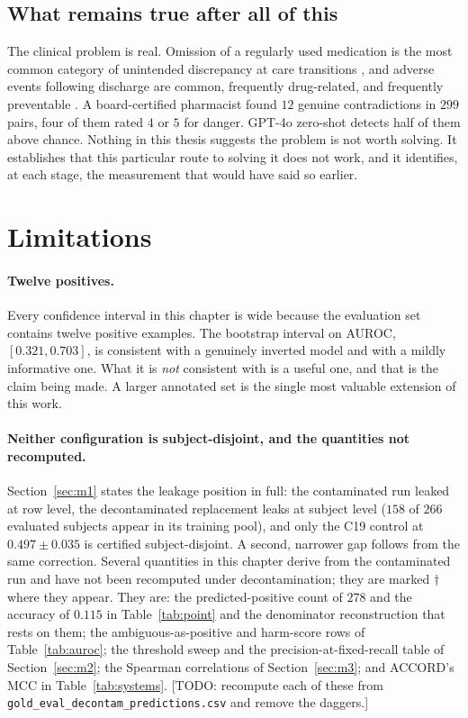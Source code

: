 \subsection{What remains true after all of this}

The clinical problem is real. Omission of a regularly used medication is the
most common category of unintended discrepancy at care transitions
\citep{cornish2005discrepancies}, and adverse events following discharge are
common, frequently drug-related, and frequently preventable
\citep{forster2003adverse}. A board-certified pharmacist found $12$ genuine
contradictions in $299$ pairs, four of them rated $4$ or $5$ for danger. GPT-4o
zero-shot detects half of them above chance. Nothing in this thesis suggests the
problem is not worth solving. It establishes that this particular route to
solving it does not work, and it identifies, at each stage, the measurement that
would have said so earlier.

\section{Limitations}
\label{sec:eval-limitations}

\paragraph{Twelve positives.} Every confidence interval in this chapter is wide
because the evaluation set contains twelve positive examples. The bootstrap
interval on AUROC, $[0.321, 0.703]$, is consistent with a genuinely inverted
model and with a mildly informative one. What it is \emph{not} consistent with
is a useful one, and that is the claim being made. A larger annotated set is the
single most valuable extension of this work.

\paragraph{Neither configuration is subject-disjoint, and the quantities not
recomputed.} Section~\ref{sec:m1} states the leakage position in full: the
contaminated run leaked at row level, the decontaminated replacement leaks at
subject level ($158$ of $266$ evaluated subjects appear in its training pool),
and only the C19 control at $0.497 \pm 0.035$ is certified subject-disjoint. A
second, narrower gap follows from the same correction. Several quantities in
this chapter derive from the contaminated run and have not been recomputed under
decontamination; they are marked $\dagger$ where they appear. They are: the
predicted-positive count of $278$ and the accuracy of $0.115$ in
Table~\ref{tab:point} and the denominator reconstruction that rests on them; the
ambiguous-as-positive and harm-score rows of Table~\ref{tab:auroc}; the
threshold sweep and the precision-at-fixed-recall table of Section~\ref{sec:m2};
the Spearman correlations of Section~\ref{sec:m3}; and ACCORD's MCC in
Table~\ref{tab:systems}. [TODO: recompute each of these from
\texttt{gold\_eval\_decontam\_predictions.csv} and remove the daggers.]

